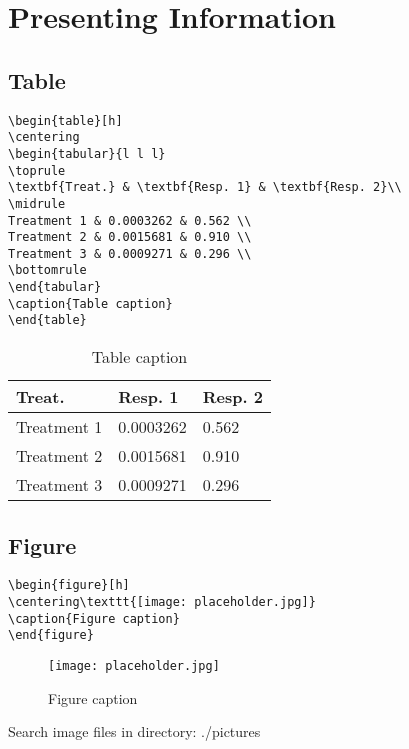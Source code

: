 \chapter{Presenting Information}


\section{Table}
\lipsum[1] 

\begin{notebox}
\begin{verbatim}
\begin{table}[h]
\centering
\begin{tabular}{l l l}
\toprule
\textbf{Treat.} & \textbf{Resp. 1} & \textbf{Resp. 2}\\
\midrule
Treatment 1 & 0.0003262 & 0.562 \\
Treatment 2 & 0.0015681 & 0.910 \\
Treatment 3 & 0.0009271 & 0.296 \\
\bottomrule
\end{tabular}
\caption{Table caption}
\end{table}
\end{verbatim}
\end{notebox}
\begin{table}[h]
\centering
\begin{tabular}{l l l}
\toprule
\textbf{Treat.} & \textbf{Resp. 1} & \textbf{Resp. 2}\\
\midrule
Treatment 1 & 0.0003262 & 0.562 \\
Treatment 2 & 0.0015681 & 0.910 \\
Treatment 3 & 0.0009271 & 0.296 \\
\bottomrule
\end{tabular}
\caption{Table caption}
\end{table}

\section{Figure}

\lipsum[1] 

\begin{notebox}
\begin{verbatim}
\begin{figure}[h]
\centering\texttt{[image: placeholder.jpg]}
\caption{Figure caption}
\end{figure}
\end{verbatim}
\end{notebox}
\begin{figure}[h]
\centering\texttt{[image: placeholder.jpg]}
\caption{Figure caption}
\end{figure}

\begin{attentionbox}
Search image files in directory: ./pictures\\
\end{attentionbox}

